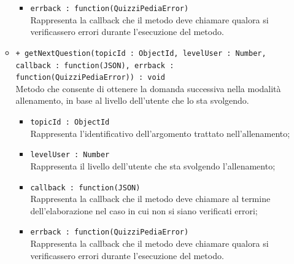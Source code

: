 \begin{itemize}
\begin{itemize}
\begin{itemize}
			\item \texttt{errback : function(QuizziPediaError)} \\
			Rappresenta la callback che il metodo deve chiamare qualora si verificassero errori durante l'esecuzione del metodo.
			\end{itemize}
			\item \texttt{+ getNextQuestion(topicId : ObjectId, levelUser : Number, callback : function(JSON), errback : function(QuizziPediaError)) : void} \\
			Metodo che consente di ottenere la domanda successiva nella modalità allenamento, in base al livello dell'utente che lo sta svolgendo. \\
			\begin{itemize}
			\item \texttt{topicId : ObjectId} \\
			Rappresenta l'identificativo dell'argomento trattato nell'allenamento;
			\item \texttt{levelUser : Number} \\
			Rappresenta il livello dell'utente che sta svolgendo l'allenamento;
			\item \texttt{callback : function(JSON)} \\
			Rappresenta la callback che il metodo deve chiamare al termine dell'elaborazione nel caso in cui non si siano verificati errori;
			\item \texttt{errback : function(QuizziPediaError)} \\
			Rappresenta la callback che il metodo deve chiamare qualora si verificassero errori durante l'esecuzione del metodo.
			\end{itemize}
		\end{itemize}
\end{itemize}